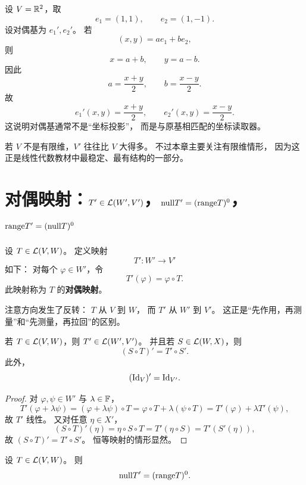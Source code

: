 \begin{example} 设 $V=\mathbb{R}^2$，取 \[ e_1=(1,1),\qquad e_2=(1,-1). \] 设对偶基为 $e_1',e_2'$。 若 \[ (x,y)=a e_1+b e_2, \] 则 \[ x=a+b,\qquad y=a-b. \] 因此 \[ a=\frac{x+y}{2},\qquad b=\frac{x-y}{2}. \] 故 \[ e_1'(x,y)=\frac{x+y}{2},\qquad e_2'(x,y)=\frac{x-y}{2}. \] 这说明对偶基通常不是“坐标投影”， 而是与原基相匹配的坐标读取器。 \end{example}




\begin{remark} 若 $V$ 不是有限维，$V'$ 往往比 $V$ 大得多。 不过本章主要关注有限维情形， 因为这正是线性代数教材中最稳定、最有结构的一部分。 \end{remark}




\section{对偶映射：$T'\in \mathcal{L}(W',V')$，$\mathrm{null} T'=(\mathrm{range} T)^0$，$\mathrm{range} T'=(\mathrm{null} T)^0$}




\begin{definition} 设 $T\in\mathcal{L}(V,W)$。 定义映射 \[ T':W'\to V' \] 如下： 对每个 $\varphi\in W'$，令 \[ T'(\varphi)=\varphi\circ T. \] 此映射称为 $T$ 的\textbf{对偶映射}。 \end{definition} 注意方向发生了反转： $T$ 从 $V$ 到 $W$， 而 $T'$ 从 $W'$ 到 $V'$。 这正是“先作用，再测量”和“先测量，再拉回”的区别。




\begin{proposition} 若 $T\in\mathcal{L}(V,W)$，则 $T'\in\mathcal{L}(W',V')$。 并且若 $S\in\mathcal{L}(W,X)$，则 \[ (S\circ T)'=T'\circ S'. \] 此外， \[ (\mathrm{Id}_V)'=\mathrm{Id}_{V'}. \] \end{proposition}




\begin{proof} 对 $\varphi,\psi\in W'$ 与 $\lambda\in\mathbb{F}$， \[ T'(\varphi+\lambda\psi) =(\varphi+\lambda\psi)\circ T =\varphi\circ T+\lambda(\psi\circ T) =T'(\varphi)+\lambda T'(\psi), \] 故 $T'$ 线性。 又对任意 $\eta\in X'$， \[ (S\circ T)'(\eta)=\eta\circ S\circ T=T'(\eta\circ S)=T'(S'(\eta)), \] 故 $(S\circ T)'=T'\circ S'$。 恒等映射的情形显然。 \end{proof}




\begin{theorem} 设 $T\in\mathcal{L}(V,W)$。 则 \[ \mathrm{null} T'=(\mathrm{range} T)^0. \] \end{theorem}




